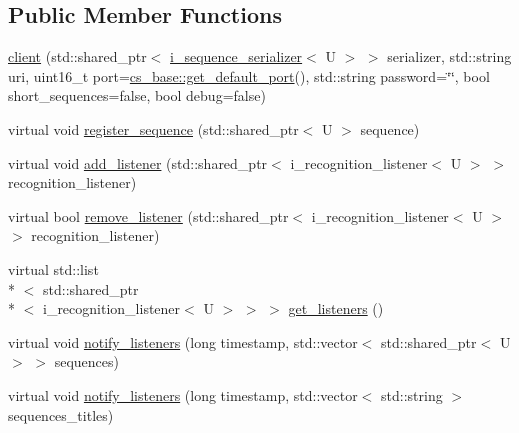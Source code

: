 \subsection*{Public Member Functions}
\begin{DoxyCompactItemize}
\item 
\hyperlink{classmae_1_1eventing_1_1client_aa332e5c651789944e7871c1f3fd8cc8c}{client} (std\-::shared\-\_\-ptr$<$ \hyperlink{classmae_1_1eventing_1_1i__sequence__serializer}{i\-\_\-sequence\-\_\-serializer}$<$ U $>$ $>$ serializer, std\-::string uri, uint16\-\_\-t port=\hyperlink{classmae_1_1eventing_1_1cs__base_a5c068f50b548ec7299133976c00fa5a4}{cs\-\_\-base\-::get\-\_\-default\-\_\-port}(), std\-::string password=\char`\"{}\char`\"{}, bool short\-\_\-sequences=false, bool debug=false)
\item 
virtual void \hyperlink{classmae_1_1eventing_1_1client_a8d6b202397c1f209a7eb06f0270e26e7}{register\-\_\-sequence} (std\-::shared\-\_\-ptr$<$ U $>$ sequence)
\item 
virtual void \hyperlink{classmae_1_1eventing_1_1client_a386bcfe7d090b991ed4949856b092a67}{add\-\_\-listener} (std\-::shared\-\_\-ptr$<$ i\-\_\-recognition\-\_\-listener$<$ U $>$ $>$ recognition\-\_\-listener)
\item 
virtual bool \hyperlink{classmae_1_1eventing_1_1client_a929df1715e36580d2233413c2ea3224a}{remove\-\_\-listener} (std\-::shared\-\_\-ptr$<$ i\-\_\-recognition\-\_\-listener$<$ U $>$ $>$ recognition\-\_\-listener)
\item 
virtual std\-::list\\*
$<$ std\-::shared\-\_\-ptr\\*
$<$ i\-\_\-recognition\-\_\-listener$<$ U $>$ $>$ $>$ \hyperlink{classmae_1_1eventing_1_1client_a89ba2ddd24cda5f89efdea85ce01c82d}{get\-\_\-listeners} ()
\item 
virtual void \hyperlink{classmae_1_1eventing_1_1client_a787a1fb0b964d99676ce2a1da0a0c4fe}{notify\-\_\-listeners} (long timestamp, std\-::vector$<$ std\-::shared\-\_\-ptr$<$ U $>$ $>$ sequences)
\item 
virtual void \hyperlink{classmae_1_1eventing_1_1client_a46e28e540f0d823059268e1a275afe0e}{notify\-\_\-listeners} (long timestamp, std\-::vector$<$ std\-::string $>$ sequences\-\_\-titles)
\end{DoxyCompactItemize}
